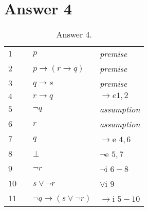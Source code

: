 \documentclass[12pt]{article}
\begin{document}
\section*{Answer 4}
\begin{table}[H]
	\centering
	\caption{Answer 4.}
	\begin{tabular}{*4{l}}
		$1$ & & $p$ & \textit{premise} \\ 
		$2$ & & $p\rightarrow (r \rightarrow q)$ & \textit{premise}\\
		$3$ & & $q \rightarrow s$ & \textit{premise}\\
		$4$ & & $r \rightarrow q$ & \textit{$\rightarrow e  1,2$ } \\
		\hline \hline     %

		$5$ & & $\neg q$ &\textit{assumption}\\ 
		\hline
		
		$6$ & & $r$ & \textit{assumption}\\
		
		$7$ & & $q$ & $\rightarrow$e $4,6$\\ 
		
		$8$ & & $\bot$ & $\neg$e $5,7$\\ 
		\hline
		$9$ & & $\neg r$ & $\neg$i $6-8$ \\  
		
		$10$ & & $s \vee \neg r$ & $\vee$i $9$ \\  
		\hline \hline                               %
		
		$11$ & & $\neg q \rightarrow(s\vee \neg r)$ & $\rightarrow$i $5-10$ \\
		
	\end{tabular}
\end{table}
\end{document}
